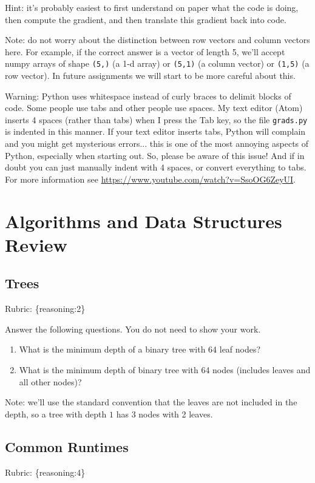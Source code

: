 \documentclass{article}
\def\rubric#1{\gre{Rubric: \{#1\}}}{}
\def\blu#1{{\color{blu}#1}}
\def\gre#1{{\color{gre}#1}}
\begin{document}
Hint: it's probably easiest to first understand on paper what the code is doing, then compute
the gradient, and then translate this gradient back into code.

Note: do not worry about the distinction between row vectors and column vectors here.
For example, if the correct answer is a vector of length 5, we'll accept numpy arrays
of shape \texttt{(5,)} (a 1-d array) or \texttt{(5,1)} (a column vector) or
\texttt{(1,5)} (a row vector). In future assignments we will start to be more careful
about this.

Warning: Python uses whitespace instead of curly braces to delimit blocks of code.
Some people use tabs and other people use spaces. My text editor (Atom) inserts 4 spaces (rather than tabs) when
I press the Tab key, so the file \texttt{grads.py} is indented in this manner. If your text editor inserts tabs,
Python will complain and you might get mysterious errors... this is one of the most annoying aspects
of Python, especially when starting out. So, please be aware of this issue! And if in doubt you can just manually
indent with 4 spaces, or convert everything to tabs. For more information
see \url{https://www.youtube.com/watch?v=SsoOG6ZeyUI}.


\section{Algorithms and Data Structures Review}

\subsection{Trees}
\rubric{reasoning:2}

\blu{Answer the following questions.} You do not need to show your work.

\begin{enumerate}
\item What is the minimum depth of a binary tree with 64 leaf nodes?
\item What is the minimum depth of binary tree with 64 nodes (includes leaves and all other nodes)?
\end{enumerate}
Note: we'll use the standard convention that the leaves are not included in the depth, so a tree with depth $1$ has 3 nodes with 2 leaves.

\subsection{Common Runtimes}
\rubric{reasoning:4}
\end{document}
